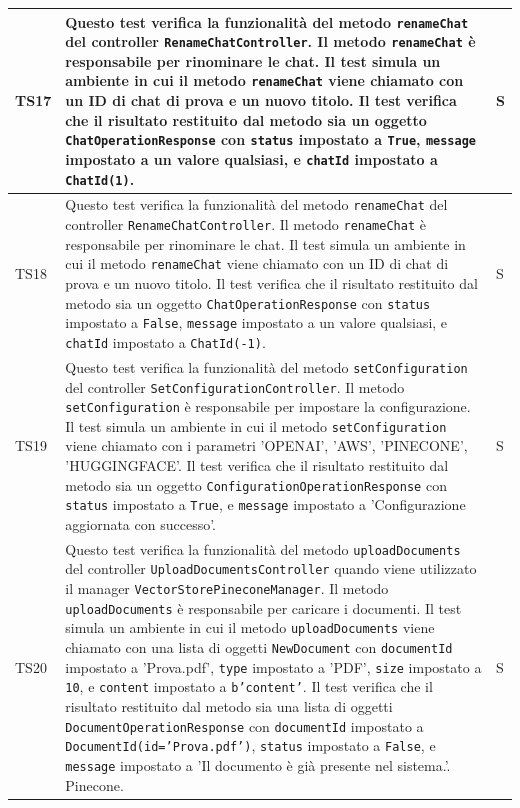 \documentclass[10pt, a4paper]{article}
\begin{document}
\begin{xltabular}{\textwidth}{p{0.12\textwidth}|X|p{0.12\textwidth}}
    \hline
    TS17 & Questo test verifica la funzionalità del metodo \texttt{renameChat} del controller \texttt{RenameChatController}. Il metodo \texttt{renameChat} è responsabile per rinominare le chat. Il test simula un ambiente in cui il metodo \texttt{renameChat} viene chiamato con un ID di chat di prova e un nuovo titolo. Il test verifica che il risultato restituito dal metodo sia un oggetto \texttt{ChatOperationResponse} con \texttt{status} impostato a \texttt{True}, \texttt{message} impostato a un valore qualsiasi, e \texttt{chatId} impostato a \texttt{ChatId(1)}.  & S \\
    \hline
    TS18 & Questo test verifica la funzionalità del metodo \texttt{renameChat} del controller \texttt{RenameChatController}. Il metodo \texttt{renameChat} è responsabile per rinominare le chat. Il test simula un ambiente in cui il metodo \texttt{renameChat} viene chiamato con un ID di chat di prova e un nuovo titolo. Il test verifica che il risultato restituito dal metodo sia un oggetto \texttt{ChatOperationResponse} con \texttt{status} impostato a \texttt{False}, \texttt{message} impostato a un valore qualsiasi, e \texttt{chatId} impostato a \texttt{ChatId(-1)}.  & S \\
    \hline
    TS19 & Questo test verifica la funzionalità del metodo \texttt{setConfiguration} del controller \texttt{SetConfigurationController}. Il metodo \texttt{setConfiguration} è responsabile per impostare la configurazione. Il test simula un ambiente in cui il metodo \texttt{setConfiguration} viene chiamato con i parametri 'OPENAI', 'AWS', 'PINECONE', 'HUGGINGFACE'. Il test verifica che il risultato restituito dal metodo sia un oggetto \texttt{ConfigurationOperationResponse} con \texttt{status} impostato a \texttt{True}, e \texttt{message} impostato a 'Configurazione aggiornata con successo'.  & S \\
    \hline
    TS20 & Questo test verifica la funzionalità del metodo \texttt{uploadDocuments} del controller \texttt{UploadDocumentsController} quando viene utilizzato il manager \texttt{VectorStorePineconeManager}. Il metodo \texttt{uploadDocuments} è responsabile per caricare i documenti. Il test simula un ambiente in cui il metodo \texttt{uploadDocuments} viene chiamato con una lista di oggetti \texttt{NewDocument} con \texttt{documentId} impostato a 'Prova.pdf', \texttt{type} impostato a 'PDF', \texttt{size} impostato a \texttt{10}, e \texttt{content} impostato a \texttt{b'content'}. Il test verifica che il risultato restituito dal metodo sia una lista di oggetti \texttt{DocumentOperationResponse} con \texttt{documentId} impostato a \texttt{DocumentId(id='Prova.pdf')}, \texttt{status} impostato a \texttt{False}, e \texttt{message} impostato a 'Il documento è già presente nel sistema.'. Pinecone.  & S \\

\end{xltabular}
\end{document}
